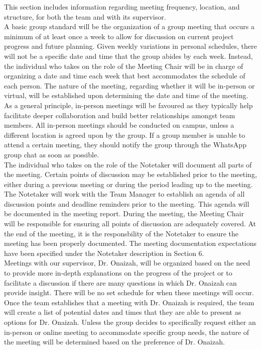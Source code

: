 \documentclass{article}
\begin{document}
\fi

This section includes information regarding meeting frequency, location, and structure, for both the team and with its supervisor.\\

A basic group standard will be the organization of a group meeting that occurs a minimum of at least once a week to
allow for discussion on current project progress and future planning. Given weekly variations in personal schedules, there
will not be a specific date and time that the group abides by each week. Instead, the individual who takes on the
role of the Meeting Chair will be in charge of organizing a date and time each week that best accommodates the
schedule of each person. The nature of the meeting, regarding whether it will be in-person or virtual, will be
established upon determining the date and time of the meeting. As a general principle, in-person meetings will be
favoured as they typically help facilitate deeper collaboration and build better relationships amongst team
members. All in-person meetings should be conducted on campus, unless a different location is agreed upon by the
group. If a group member is unable to attend a certain meeting, they should notify the group through the WhatsApp
group chat as soon as possible.\\

The individual who takes on the role of the Notetaker will document all parts of the meeting. Certain points of
discussion may be established prior to the meeting, either during a previous meeting or during the period leading
up to the meeting. The Notetaker will work with the Team Manager to establish an agenda of all discussion points
and deadline reminders prior to the meeting. This agenda will be documented in the meeting report. During the
meeting, the Meeting Chair will be responsible for ensuring all points of discussion are adequately covered. At the
end of the meeting, it is the responsbility of the Notetaker to ensure the meeting has been properly documented.
The meeting documentation expectations have been specified under the Notetaker description in Section 6.\\

Meetings with our supervisor, Dr. Onaizah, will be organized based on the need to provide more in-depth explanations
on the progress of the project or to facilitate a discussion if there are many questions in which Dr. Onaizah can
provide insight. There will be no set schedule for when these meetings will occur. Once the team establishes that a
meeting with Dr. Onaizah is required, the team will create a list of potential dates and times that they are able
to present as options for Dr. Onaizah. Unless the group decides to specifically request either an in-person or
online meeting to accommodate specific group needs, the nature of the meeting will be determined based on the
preference of Dr. Onaizah.
\end{document}
